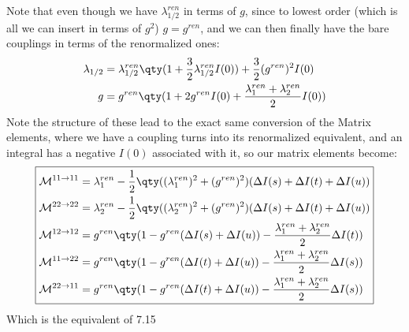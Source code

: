 \documentclass[12pt]{article}
\begin{document}
Note that even though we have $\lambda_{1/2}^{ren}$ in terms of $g$, since to lowest order (which is all we can insert in terms of $g^2$) $g=g^{ren}$, and we can then finally have the bare couplings in terms of the renormalized ones:
\begin{align*}
  \lambda_{1/2}&=\lambda_{1/2}^{ren}\qty(1+\frac32\lambda_{1/2}^{ren}I(0))
  +\frac32(g^{ren})^2I(0)\\
  g&=g^{ren}\qty(1+2g^{ren}I(0)+\frac{\lambda_1^{ren}+\lambda_2^{ren}}2I(0))
\end{align*}
Note the structure of these lead to the exact same conversion of the Matrix elements, where we have a coupling turns into its renormalized equivalent, and an integral has a negative $I(0)$ associated with it, so our matrix elements become:
\begin{equation}
  \boxed{
    \begin{aligned}
      \mathcal{M}^{11\to11}&=\lambda_1^{ren}
      -\frac12\qty((\lambda_1^{ren})^2+(g^{ren})^2)
      (\Delta I(s)+\Delta I(t)+\Delta I(u))\\
      \mathcal{M}^{22\to22}&=\lambda_2^{ren}
      -\frac12\qty((\lambda_2^{ren})^2+(g^{ren})^2)
      (\Delta I(s)+\Delta I(t)+\Delta I(u))\\
      \mathcal{M}^{12\to12}&=
      g^{ren}\qty(1-g^{ren}(\Delta I(s)+\Delta I(u))
      -\frac{\lambda_1^{ren}+\lambda_2^{ren}}2\Delta I(t))\\
      \mathcal{M}^{11\to22}&=
      g^{ren}\qty(1-g^{ren}(\Delta I(t)+\Delta I(u))
      -\frac{\lambda_1^{ren}+\lambda_2^{ren}}2\Delta I(s))\\
      \mathcal{M}^{22\to11}&=
      g^{ren}\qty(1-g^{ren}(\Delta I(t)+\Delta I(u))
      -\frac{\lambda_1^{ren}+\lambda_2^{ren}}2\Delta I(s))
    \end{aligned}}
\end{equation}
Which is the equivalent of 7.15
\end{document}
